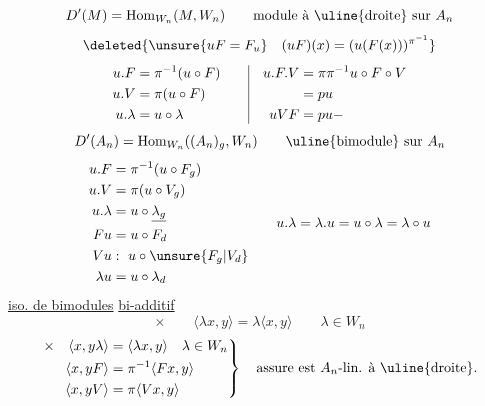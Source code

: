 \[
D'(M)=\operatorname{Hom}_{W_n}(M,W_n)\qquad\text{module à \uline{droite} sur }A_n
\]
\[
\deleted{\unsure{uF=F_u}\quad(uF)(x)=(u(F(x)))^{\pi^{-1}}}
\]
\[
\begin{aligned}u.F&=\pi^{-1}(u\circ F)\\u.V&=\pi(u\circ F)\\u.\lambda&=u\circ\lambda\end{aligned}
\qquad\vrule\quad\begin{aligned}u.F.V&=\pi\pi^{-1}u\circ F\circ V\\&=pu\\uVF&=pu\mathbin{-}\end{aligned}
\]
\[
D'(A_n)=\operatorname{Hom}_{W_n}((A_n)_g,W_n)\qquad\text{\uline{bimodule} sur }A_n
\]
\[
\begin{aligned}
u.F&=\pi^{-1}(u\circ F_g)\\u.V&=\pi(u\circ V_g)\\u.\lambda&=u\circ\underline{\lambda_g}\\Fu&=u\circ F_d\\Vu&:\ u\circ\unsure{F_g|V_d}\\\lambda u&=u\circ\lambda_d
\end{aligned}
\qquad u.\lambda=\lambda.u=u\circ\lambda=\lambda\circ u
\]
\uline{iso. de bimodules}
\uline{bi-additif}
\[
\times\qquad\langle\lambda x,y\rangle=\lambda\langle x,y\rangle\qquad\lambda\in W_n
\]
\[
\left.\begin{aligned}
\times\quad\langle x,y\lambda\rangle&=\langle\lambda x,y\rangle\quad\lambda\in W_n\\
\langle x,yF\rangle&=\pi^{-1}\langle Fx,y\rangle\\
\langle x,yV\rangle&=\pi\langle Vx,y\rangle
\end{aligned}\right\}\quad\text{assure est }A_n\text{-lin. à \uline{droite}.}
\]
